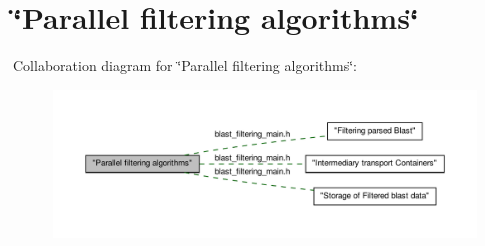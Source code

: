 \hypertarget{group__pipe__filters}{
\section{\char`\"{}Parallel filtering algorithms\char`\"{}}
\label{group__pipe__filters}
}
Collaboration diagram for \char`\"{}Parallel filtering algorithms\char`\"{}:\nopagebreak
\begin{figure}[H]
\begin{center}
\leavevmode
\includegraphics[width=400pt]{group__pipe__filters}
\end{center}
\end{figure}
